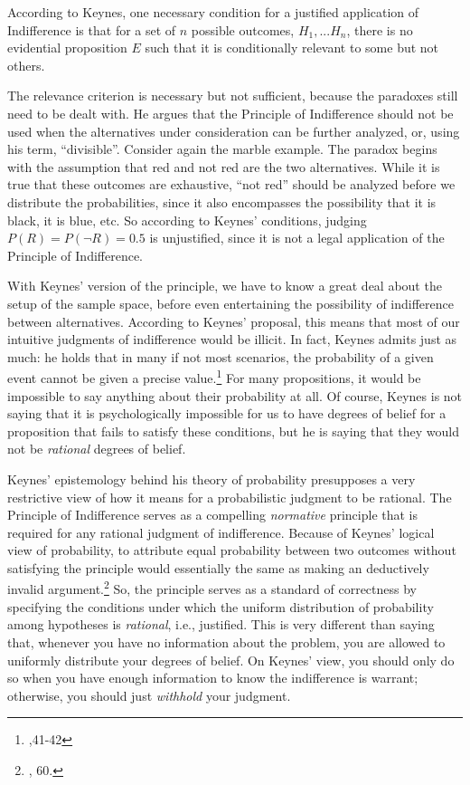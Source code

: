 According to Keynes, one necessary condition for a justified application
of Indifference is that for a set of \(n\) possible outcomes,
\(H_1,...H_n\), there is no evidential proposition \(E\) such that it is
conditionally relevant to some but not others.

The relevance criterion is necessary but not sufficient, because the
paradoxes still need to be dealt with. He argues that the Principle of
Indifference should not be used when the alternatives under
consideration can be further analyzed, or, using his term,
``divisible''. Consider again the marble example. The paradox begins
with the assumption that red and not red are the two alternatives. While
it is true that these outcomes are exhaustive, ``not red'' should be
analyzed before we distribute the probabilities, since it also
encompasses the possibility that it is black, it is blue, etc. So
according to Keynes' conditions, judging \(P(R) = P(\neg R) = 0.5\) is
unjustified, since it is not a legal application of the Principle of
Indifference.

With Keynes' version of the principle, we have to know a great deal
about the setup of the sample space, before even entertaining the
possibility of indifference between alternatives. According to Keynes'
proposal, this means that most of our intuitive judgments of
indifference would be illicit. In fact, Keynes admits just as much: he
holds that in many if not most scenarios, the probability of a given
event cannot be given a precise value.\footnote{\cite{keynes},41-42} For many propositions, it would
be impossible to say anything about their probability at all. Of course,
Keynes is not saying that it is psychologically impossible for us to
have degrees of belief for a proposition that fails to satisfy these
conditions, but he is saying that they would not be \emph{rational}
degrees of belief.

Keynes' epistemology behind his theory of probability presupposes a very restrictive view of how it means for a probabilistic judgment to be rational.  The Principle of Indifference serves as a compelling \emph{normative} principle that is required for any rational judgment of indifference. Because of Keynes' logical view of probability, to attribute equal probability between two outcomes without satisfying the principle would essentially the same as making an deductively invalid argument.\footnote{\cite{keynes}, 60.}
So, the principle serves as a standard of correctness by specifying the conditions under which the uniform distribution of probability among hypotheses is \emph{rational}, i.e., justified. This is very different than saying that, whenever you have no information about the problem, you are allowed to uniformly distribute your degrees of belief. On Keynes' view, you should only do so when you have enough information to know the indifference is warrant; otherwise, you should just \emph{withhold} your judgment.

